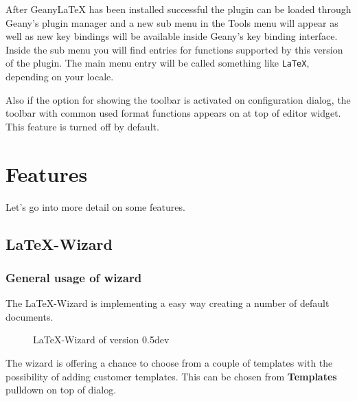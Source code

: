 \documentclass[%
a4paper,%
10pt,%
oneside,%
DIV18,
headsepline,
plainheadsepline,
footsepline,
plainfootsepline,
bibtotoc,%
liststotoc,%
BCOR12mm,%
halfparskip,%
openany,%
]{scrartcl}
\begin{document}
After Geany\LaTeX{} has been installed successful the plugin can be
loaded through Geany's plugin manager and a new sub menu in the Tools
menu will appear as well as new key bindings will be available inside
Geany's key binding interface. Inside the sub menu you will find entries
for functions supported by this version of the plugin. The main menu entry
will be called something like \texttt{LaTeX}, depending on your locale.

Also if the option for showing the toolbar is activated on configuration
dialog, the toolbar with common used format functions appears on at top
of editor widget. This feature is turned off by default.


\section{Features}

Let's go into more detail on some features.


\subsection{\LaTeX-Wizard}

\subsubsection{General usage of wizard}
The \LaTeX-Wizard is implementing a easy way creating a number of
default documents.
\begin{figure}[h!]
	\caption{\LaTeX-Wizard of version 0.5dev}
\end{figure}

The wizard is offering a chance to choose from a couple of templates
with the possibility of adding customer templates. This can be
chosen from \textbf{Templates} pulldown on top of dialog.
\end{document}
